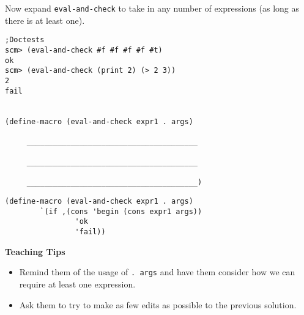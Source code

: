 \begin{blocksection}
\question Now expand \texttt{eval-and-check} to take in any number of expressions (as long as there is at least one).

\begin{lstlisting}
;Doctests
scm> (eval-and-check #f #f #f #f #t)
ok
scm> (eval-and-check (print 2) (> 2 3))
2
fail


(define-macro (eval-and-check expr1 . args)
     
     _______________________________________

     _______________________________________

     _______________________________________)
\end{lstlisting}
\begin{solution}[.25in]
\begin{lstlisting}
(define-macro (eval-and-check expr1 . args)
        `(if ,(cons 'begin (cons expr1 args))
                'ok
                'fail))
\end{lstlisting}
\end{solution}
\end{blocksection}

\begin{blocksection}
\begin{guide}
\textbf{Teaching Tips}
\begin{itemize}
	\item Remind them of the usage of \lstinline{. args} and have them consider how we can require at least one expression.
	\item Ask them to try to make as few edits as possible to the previous solution.
\end{itemize}
\end{guide}
\end{blocksection}